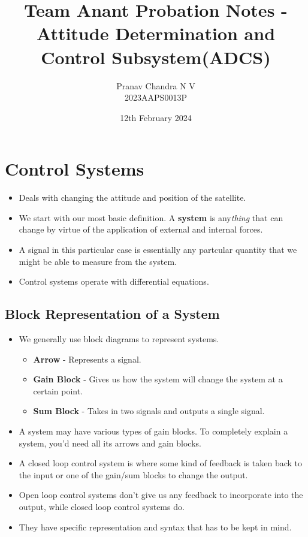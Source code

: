 \documentclass[a4paper, 11pt]{article}
\title{Team Anant Probation Notes - Attitude Determination and Control Subsystem(ADCS)} %
\date{12th February 2024} %
\author{Pranav Chandra N V\\2023AAPS0013P} %
\begin{document}
	\maketitle
	\newpage
	
	\newpage
	\section{Control Systems}
	\begin{itemize}
		\item Deals with changing the attitude and position of the satellite.
		\item We start with our most basic definition. A \textbf{system} is any\textit{thing} that can change by virtue of the application of external and internal forces.
		\item A signal in this particular case is essentially any partcular quantity that we might be able to measure from the system.
		\item Control systems operate with differential equations.
	\end{itemize}
	\subsection{Block Representation of a System}
	\begin{itemize}
		\item We generally use block diagrams to represent systems.
		\begin{itemize}
			\item \textbf{Arrow} - Represents a signal.
			\item \textbf{Gain Block} - Gives us how the system will change the system at a certain point.
			\item \textbf{Sum Block} - Takes in two signals and outputs a single signal.
		\end{itemize}
		\item A system may have various types of gain blocks. To completely explain a system, you'd need all its arrows and gain blocks.
		\item A closed loop control system is where some kind of feedback is taken back to the input or one of the gain/sum blocks to change the output.
		\item Open loop control systems don't give us any feedback to incorporate into the output, while closed loop control systems do.
		\item They have specific representation and syntax that has to be kept in mind.
	\end{itemize}
\end{document}
